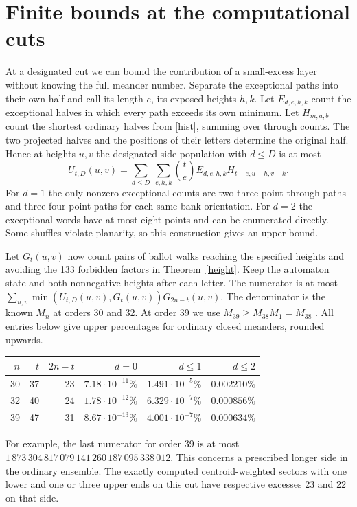 \documentclass[11pt]{article}
\begin{document}
\newpage
\section{Finite bounds at the computational cuts}
At a designated cut we can bound the contribution of a small-excess layer without knowing the full meander number. Separate the exceptional paths into their own half and call its length \(e\), its exposed heights \(h,k\). Let \(E_{d,e,h,k}\) count the exceptional halves in which every path exceeds its own minimum. Let \(H_{m,a,b}\) count the shortest ordinary halves from \eqref{hist}, summing over through counts. The two projected halves and the positions of their letters determine the original half. Hence at heights \(u,v\) the designated-side population with \(d\le D\) is at most
\[
 U_{t,D}(u,v)=\sum_{d\le D}\ \sum_{e,h,k}
 \binom{t}{e} E_{d,e,h,k} H_{t-e,u-h,v-k}.
\]
For \(d=1\) the only nonzero exceptional counts are two three-point through paths and three four-point paths for each same-bank orientation. For \(d=2\) the exceptional words have at most eight points and can be enumerated directly. Some shuffles violate planarity, so this construction gives an upper bound.

Let \(G_t(u,v)\) now count pairs of ballot walks reaching the specified heights and avoiding the 133 forbidden factors in Theorem~\ref{height}. Keep the automaton state and both nonnegative heights after each letter. The numerator is at most
\(\sum_{u,v}\min(U_{t,D}(u,v),G_t(u,v))G_{2n-t}(u,v)\).
The denominator is the known \(M_n\) at orders 30 and 32. At order 39 we use \(M_{39}\ge M_{38}M_1=M_{38}\) \cite{ap,closed}. All entries below give upper percentages for ordinary closed meanders, rounded upwards.

\begin{center}
\begin{tabular}{rrr rrr}
\toprule
\(n\)& \(t\)& \(2n-t\)& \(d=0\) & \(d\le1\)& \(d\le2\)\\\midrule
30&37&23& \(7.18\cdot10^{-11}\%\)& \(1.491\cdot10^{-5}\%\)& \(0.002210\%\)\\
32&40&24& \(1.78\cdot10^{-12}\%\)& \(6.329\cdot10^{-7}\%\)& \(0.000856\%\)\\
39&47&31& \(8.67\cdot10^{-13}\%\)& \(4.001\cdot10^{-7}\%\)& \(0.000634\%\)\\
\bottomrule
\end{tabular}
\end{center}
For example, the last numerator for order 39 is at most
\(1\,873\,304\,817\,079\,141\,260\,187\,095\,338\,012\). This concerns a prescribed longer side in the ordinary ensemble. The exactly computed centroid-weighted sectors with one lower and one or three upper ends on this cut have respective excesses 23 and 22 on that side.
\end{document}

